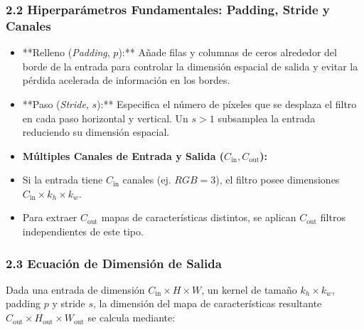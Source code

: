 \documentclass[11pt,oneside]{article}
\begin{document}
\subsubsection{2.2 Hiperparámetros Fundamentales: Padding, Stride y Canales}

\begin{itemize}

\item **Relleno (\emph{Padding}, \(p\)):** Añade filas y columnas de ceros alrededor del borde de la entrada para controlar la dimensión espacial de salida y evitar la pérdida acelerada de información en los bordes.

\end{itemize}

\begin{itemize}

\item **Paso (\emph{Stride}, \(s\)):** Especifica el número de píxeles que se desplaza el filtro en cada paso horizontal y vertical. Un \(s > 1\) subsamplea la entrada reduciendo su dimensión espacial.

\end{itemize}

\begin{itemize}

\item \textbf{Múltiples Canales de Entrada y Salida (\(C_{\text{in}}, C_{\text{out}}\)):}

\item Si la entrada tiene \(C_{\text{in}}\) canales (ej. \(RGB = 3\)), el filtro posee dimensiones \(C_{\text{in}} \times k_h \times k_w\).

\end{itemize}

\begin{itemize}

\item Para extraer \(C_{\text{out}}\) mapas de características distintos, se aplican \(C_{\text{out}}\) filtros independientes de este tipo.

\end{itemize}

\subsubsection{2.3 Ecuación de Dimensión de Salida}

Dada una entrada de dimensión \(C_{\text{in}} \times H \times W\), un kernel de tamaño \(k_h \times k_w\), padding \(p\) y stride \(s\), la dimensión del mapa de características resultante \(C_{\text{out}} \times H_{\text{out}} \times W_{\text{out}}\) se calcula mediante:
\end{document}
